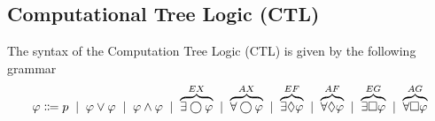 



\subsection{Computational Tree Logic (CTL)}

\begin{definition}
    The syntax of the Computation Tree Logic (CTL) is given by the following grammar
    \begin{align*}
        \varphi \Coloneqq p \;\mid\; 
        \varphi \lor \varphi \;\mid\; 
        \varphi \land \varphi \;\mid\; 
        \overbrace{\exists \bigcirc \varphi}^{EX} \;\mid\; 
        \overbrace{\forall \bigcirc \varphi}^{AX} \;\mid\;
        \overbrace{\exists \lozenge \varphi}^{EF} \;\mid\;
        \overbrace{\forall \lozenge \varphi}^{AF} \;\mid\; 
        \overbrace{\exists \square \varphi}^{EG} \;\mid\;
        \overbrace{\forall \square \varphi}^{AG}
    \end{align*}
\end{definition}

